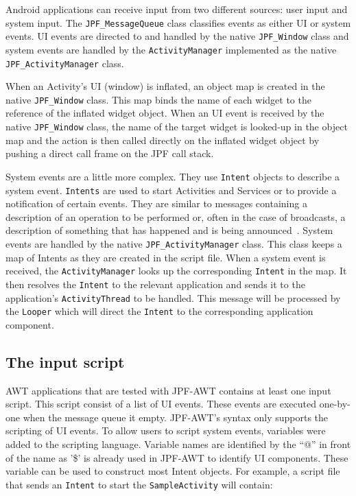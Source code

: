 \documentclass{acm_proc_article-sp}
\begin{document}
Android applications can receive input from two different sources: user input and system input. The
\texttt{JPF\_MessageQueue} class classifies events as either UI or system events. UI events are directed to and handled by the native
\texttt{JPF\_Window} class and system events are handled by the \texttt{ActivityManager} implemented as the
native \texttt{JPF\_ActivityManager} class.

When an Activity's UI (window) is inflated, an object map is created in the native \texttt{JPF\_Window} class. This
map binds the name of each widget to the reference of the inflated widget object. When an UI event is received by the native
\texttt{JPF\_Window} class, the name of the target widget is looked-up in the object map and the action is then called directly on the
inflated widget object by pushing a direct call frame on the JPF call stack. 

System events are a little more complex. They use \texttt{Intent} objects to describe a system event. \texttt{Intents} are used to start
Activities and Services or to provide a notification of certain events. They are similar to messages containing a description of an
operation to be performed or, often in the case of broadcasts, a description of something that has happened and is being
announced~\cite{AndroidDocs}. System events are handled by the native \texttt{JPF\_ActivityManager} class. This class keeps a map of Intents
as they are created in the script file. When a system event is received, the \texttt{ActivityManager} looks up the corresponding
\texttt{Intent} in the map. It then resolves the \texttt{Intent} to the relevant application and sends it to the application's
\texttt{ActivityThread} to be handled. This message will be processed by the \texttt{Looper} which will direct the \texttt{Intent} to the
corresponding application component.

\subsection{The input script}
AWT applications that are tested with JPF-AWT contains at least one input script. This script consist of a list of UI events. These
events are executed one-by-one when the message queue it empty. JPF-AWT's syntax only supports the scripting of UI events. To
allow users to script system events, variables were added to the scripting language. Variable names are identified by the ``@'' in front of
the name as '\$' is already used in JPF-AWT to identify UI components. These variable can be used to construct most Intent objects. For
example, a script file that sends an \texttt{Intent} to start the \texttt{SampleActivity} will contain:
\end{document}

